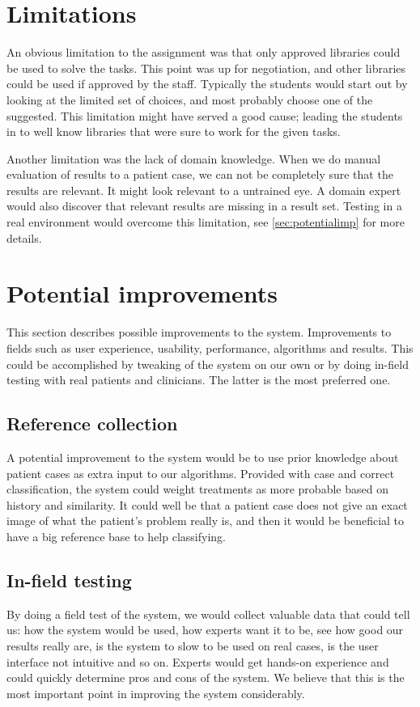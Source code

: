\section{Limitations}
An obvious limitation to the assignment was that only approved libraries could be used to solve the tasks. This point was up for negotiation, and other libraries could be used if approved by the staff. Typically the students would start out by looking at the limited set of choices, and most probably choose one of the suggested. This limitation might have served a good cause; leading the students in to well know libraries that were sure to work for the given tasks.

Another limitation was the lack of domain knowledge. When we do manual evaluation of results to a patient case, we can not be completely sure that the results are relevant. It might look relevant to a untrained eye. A domain expert would also discover that relevant results are missing in a result set. Testing in a real environment would overcome this limitation, see \autoref{sec:potentialimp} for more details.

\section{Potential improvements}
\label{sec:potentialimp}
This section describes possible improvements to the system. Improvements to fields such as user experience, usability, performance, algorithms and results. This could be accomplished by tweaking of the system on our own or by doing in-field testing with real patients and clinicians. The latter is the most preferred one. 

\subsection{Reference collection}
A potential improvement to the system would be to use prior knowledge about patient cases as extra input to our algorithms. Provided with case and correct classification, the system could weight treatments as more probable based on history and similarity. It could well be that a patient case does not give an exact image of what the patient's problem really is, and then it would be beneficial to have a big reference base to help classifying. 

\subsection{In-field testing}
By doing a field test of the system, we would collect valuable data that could tell us: how the system would be used, how experts want it to be, see how good our results really are, is the system to slow to be used on real cases, is the user interface not intuitive and so on. Experts would get hands-on experience and could quickly determine pros and cons of the system. We believe that this is the most important point in improving the system considerably.


